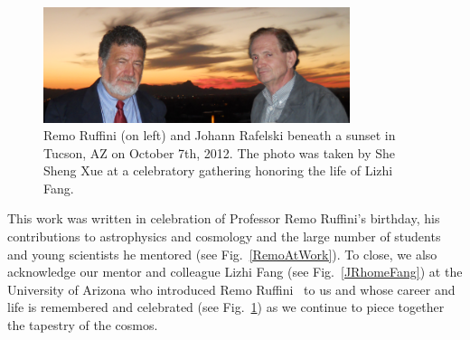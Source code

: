 \documentclass[universe,article,submit,moreauthors,pdftex,a4paper]{Definitions/mdpi}
\newcommand*{\rf}[1]{Fig.~{\ref{#1}}}
\begin{document}
\begin{figure}[ht]
\centering
\includegraphics[width=0.8\textwidth]{./plots/remo_sunset_new.PNG}
\caption{Remo Ruffini (on left) and Johann Rafelski beneath a sunset in Tucson, AZ on October 7th, 2012. The photo was taken by She Sheng Xue at a celebratory gathering honoring the life of Lizhi Fang.}
\label{remo_sunset}
\end{figure}

This work was written in celebration of Professor Remo Ruffini's birthday, his contributions to astrophysics and cosmology and the large number of students and young scientists he mentored (see \rf{RemoAtWork}). To close, we also acknowledge our mentor and colleague Lizhi Fang (see \rf{JRhomeFang}) at the University of Arizona who introduced Remo Ruffini~\cite{fang1984cosmology,fang1985galaxies,fang1987quantum} to us and whose career and life is remembered and celebrated (see \rf{remo_sunset}) as we continue to piece together the tapestry of the cosmos.


\end{document}
